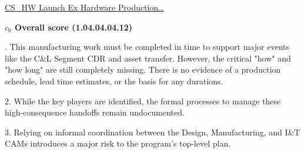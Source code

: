 % 


\begin{frame}{\href{run:../local/source-docs/1.04.04.04.12.pdf}{CS\_HW Launch Ex Hardware Production\ldots{}}}
\centering
{}
\par
\vspace{0.75em}
\textbf{\small{\(c_0\) Overall score {\tiny (1.04.04.04.12)}}}\\\par
\vspace{0.5em}
\begin{minipage}{0.85\textwidth}
\raggedright
\fontsize{7}{9}. This manufacturing work must be completed in time to support major events like the C\&L Segment CDR and asset transfer. However, the critical "how" and "how long" are still completely missing. There is no evidence of a production schedule, lead time estimates, or the basis for any durations.\par\vspace{0.5em}2. While the key players are identified, the formal processes to manage these high-consequence handoffs remain undocumented.\par\vspace{0.5em}3. Relying on informal coordination between the Design, Manufacturing, and I\&T CAMs introduces a major risk to the program's top-level plan.\par
\end{minipage}
\end{frame}
%

